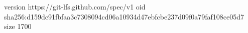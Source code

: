 version https://git-lfs.github.com/spec/v1
oid sha256:d159dc91fbfaa3c7308094cd06a10934d47ebfcbe237d09f0a79faf108ce05d7
size 1700
